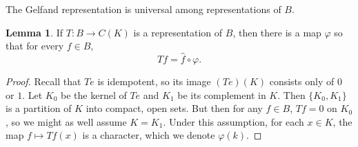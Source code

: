 \documentclass[12pt]{report}
\theoremstyle{definition}
\newtheorem{lemma}[theorem]{Lemma}
\begin{document}
    The Gelfand representation is universal among representations of $B$.
\begin{lemma}
    If $T: B \to C(K)$ is a representation of $B$, then there is a map $\varphi$ so that for every $f \in B$,
    $$Tf = \hat f \circ \varphi.$$
\end{lemma}
\begin{proof}
    Recall that $Te$ is idempotent, so its image $(Te)(K)$ consists only of $0$ or $1$. Let $K_0$ be the kernel of $Te$ and $K_1$ be its complement in $K$. Then $\{K_0, K_1\}$ is a partition of $K$ into compact, open sets. But then for any $f \in B$, $Tf = 0$ on $K_0$, so we might as well assume $K = K_1$. Under this assumption, for each $x \in K$, the map $f \mapsto Tf(x)$ is a character, which we denote $\varphi(k)$.
\end{proof}
\end{document}
